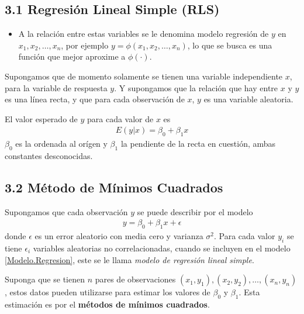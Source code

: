 \subsection{3.1 Regresi\'on Lineal Simple (RLS)}





\begin{itemize}

\item A la relaci\'on entre estas variables se le denomina modelo regresi\'on de $y$ en $x_{1},x_{2},\ldots,x_{n}$, por ejemplo $y=\phi\left(x_{1},x_{2},\ldots,x_{n}\right)$, lo que se busca es una funci\'on que mejor aproxime a $\phi\left(\cdot\right)$.

\end{itemize}

Supongamos que de momento solamente se tienen una variable independiente $x$, para la variable de respuesta $y$. Y supongamos que la relaci\'on que hay entre $x$ y $y$ es una l\'inea recta, y que para cada observaci\'on de $x$, $y$ es una variable aleatoria.

El valor esperado de $y$ para cada valor de $x$ es
\begin{eqnarray}
E\left(y|x\right)=\beta_{0}+\beta_{1}x
\end{eqnarray}
$\beta_{0}$ es la ordenada al or\'igen y $\beta_{1}$ la pendiente de la recta en cuesti\'on, ambas constantes desconocidas. 




\subsection{3.2 M\'etodo de M\'inimos Cuadrados}




Supongamos que cada observaci\'on $y$ se puede describir por el modelo
\begin{eqnarray}\label{Modelo.Regresion}
y=\beta_{0}+\beta_{1}x+\epsilon
\end{eqnarray}
donde $\epsilon$ es un error aleatorio con media cero y varianza $\sigma^{2}$. Para cada valor $y_{i}$ se tiene $\epsilon_{i}$ variables aleatorias no correlacionadas, cuando se incluyen en el modelo \ref{Modelo.Regresion}, este se le llama \textit{modelo de regresi\'on lineal simple}.


Suponga que se tienen $n$ pares de observaciones $\left(x_{1},y_{1}\right),\left(x_{2},y_{2}\right),\ldots,\left(x_{n},y_{n}\right)$, estos datos pueden utilizarse para estimar los valores de $\beta_{0}$ y $\beta_{1}$. Esta estimaci\'on es por el \textbf{m\'etodos de m\'inimos cuadrados}.









